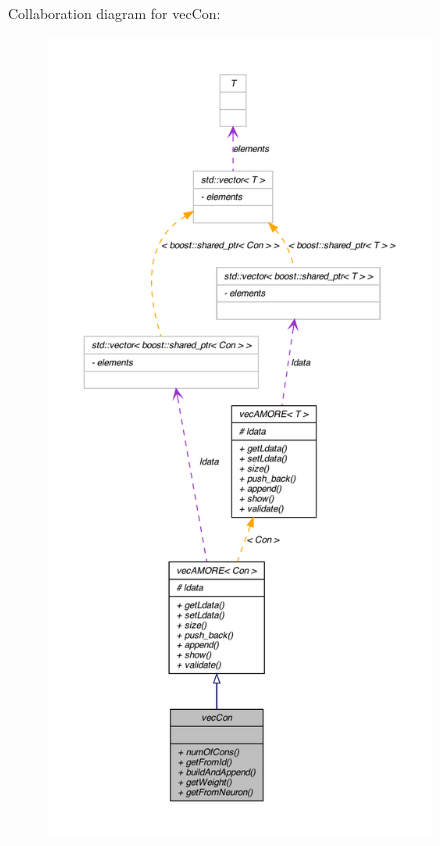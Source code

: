 Collaboration diagram for vecCon:
\nopagebreak
\begin{figure}[H]
\begin{center}
\leavevmode
\includegraphics[height=600pt]{classvec_con__coll__graph}
\end{center}
\end{figure}
